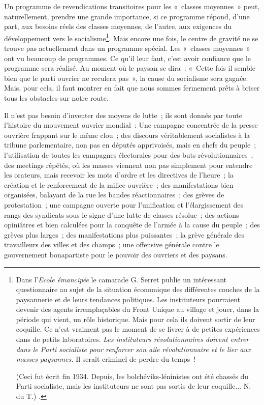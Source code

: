 \documentclass[french,twoside]{book} %
\begin{document}
Un programme de revendications transitoires pour les « classes moyennes » peut, naturellement, prendre une grande importance, si ce programme répond, d’une part, aux besoins réels des classes moyennes, de l’autre, aux exigences du développement vers le socialisme\footnote{ \noindent Dans l’\emph{Ecole émancipée} le camarade G. Serret publie un intéressant questionnaire au sujet de la situation économique des différentes couches de la paysannerie et de leurs tendances politiques. Les instituteurs pourraient devenir des agents irremplaçables du Front Unique au village et jouer, dans la période qui vient, un rôle historique. Mais pour cela ils doivent sortir de leur coquille. Ce n’est vraiment pas le moment de se livrer à de petites expériences dans de petits laboratoires. \emph{Les instituteurs révolutionnaires doivent entrer dans le Parti socialiste pour renforcer son aile révolutionnaire et le lier aux masses paysannes.} Il serait criminel de perdre du temps !\par
 (Ceci fut écrit fin 1934. Depuis, les bolchéviks-léninistes ont été chassés du Parti socialiste, mais les instituteurs ne sont pas sortis de leur coquille... N. du T.) .
 }. Mais encore une fois, le centre de gravité ne se trouve pas actuellement dans un programme spécial. Les « classes moyennes » ont vu beaucoup de programmes. Ce qu’il leur faut, c’est avoir confiance que le programme sera réalisé. Au moment où le paysan se dira : « Cette fois il semble bien que le parti ouvrier ne reculera pas », la  cause du socialisme sera gagnée. Mais, pour cela, il faut montrer en fait que nous sommes fermement prêts à briser tous les obstacles sur notre route.\par
Il n’est pas besoin d’inventer des moyens de lutte ; ils sont donnés par toute l’histoire du mouvement ouvrier mondial : Une campagne concentrée de la presse ouvrière frappant sur le même clou ; des discours véritablement socialistes à la tribune parlementaire, non pas en députés apprivoisés, mais en chefs du peuple ; l’utilisation de toutes les campagnes électorales pour des buts révolutionnaires ; des meetings répétés, où les masses viennent non pas simplement pour entendre les orateurs, mais recevoir les mots d’ordre et les directives de l’heure ; la création et le renforcement de la milice ouvrière ; des manifestations bien organisées, balayant de la rue les bandes réactionnaires ; des grèves de protestation ; une campagne ouverte pour l’unification et l’élargissement des rangs des syndicats sous le signe d’une lutte de classes résolue ; des actions opiniâtres et bien calculées pour la conquête de l’armée à la cause du peuple ; des grèves plus larges ; des manifestations plus puissantes ; la grève générale des travailleurs des villes et des champs ; une offensive générale contre le gouvernement bonapartiste pour le pouvoir des ouvriers et des paysans.\par
\end{document}
